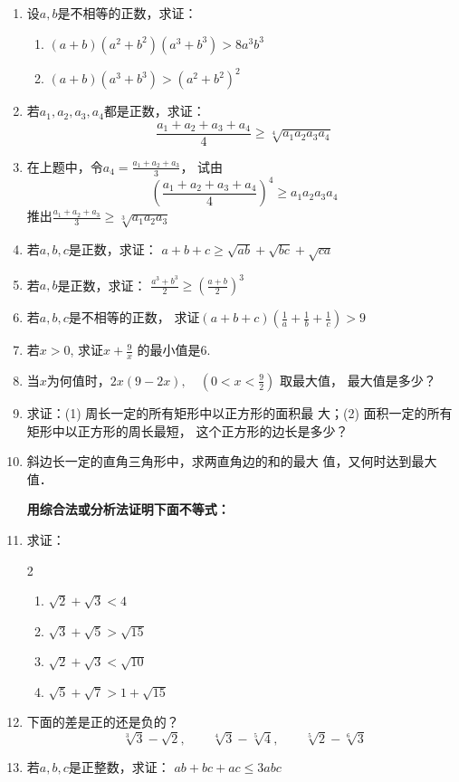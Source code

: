 \begin{enumerate}
\item 设$a,b$是不相等的正数，求证：
\begin{enumerate}
    \item $(a+b)(a^2+b^2)(a^3+b^3)>8a^3b^3$
    \item $(a+b)(a^3+b^3)>(a^2+b^2)^2$
\end{enumerate}

\item 若$a_1,a_2,a_3,a_4$都是正数，求证：
\[\frac{a_1+a_2+a_3+a_4}{4}\ge \sqrt[4]{a_1a_2a_3a_4}\]
\item 在上题中，令$a_4=\frac{a_1+a_2+a_3}{3}$，
试由\[\left(\frac{a_1+a_2+a_3+a_4}{4}\right)^4\ge a_1a_2a_3a_4\]
推出$\frac{a_1+a_2+a_3}{3}\ge \sqrt[3]{a_1a_2a_3}$

\item 若$a,b,c$是正数，求证：
$a+b+c\ge \sqrt{ab}+\sqrt{bc}+\sqrt{ca}$
\item 若$a,b$是正数，求证：
$\frac{a^3+b^3}{2}\ge \left(\frac{a+b}{2}\right)^3$
\item 若$a,b,c$是不相等的正数，
求证$(a+b+c)\left(\frac{1}{a}+\frac{1}{b}+\frac{1}{c}\right)>9$

\item 若$x>0$, 求证$x+\frac{9}{x}$
的最小值是6.
\item 当$x$为何值时，$2x(9-2x),\quad \left(0<x<\frac{9}{2}\right)$
取最大值，
最大值是多少？
\item 求证：(1) 周长一定的所有矩形中以正方形的面积最
大；(2) 面积一定的所有矩形中以正方形的周长最短，
这个正方形的边长是多少？
\item  斜边长一定的直角三角形中，求两直角边的和的最大
值，又何时达到最大值．


\textbf{用综合法或分析法证明下面不等式：}

\item 求证：
\begin{multicols}{2}
\begin{enumerate}
    \item $\sqrt{2}+\sqrt{3}<4$
    \item $\sqrt{3}+\sqrt{5}>\sqrt{15}$
    \item $\sqrt{2}+\sqrt{3}<\sqrt{10}$
    \item $\sqrt{5}+\sqrt{7}>1+\sqrt{15}$
\end{enumerate}    
\end{multicols}

\item 下面的差是正的还是负的？
\[\sqrt[3]{3}-\sqrt{2},\qquad \sqrt[4]{3}-\sqrt[5]{4},\qquad \sqrt[5]{2}-\sqrt[6]{3} \]
\item 若$a,b,c$是正整数，求证：
$ab+bc+ac\le 3abc$


\end{enumerate}
